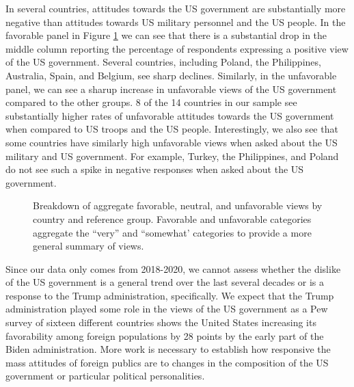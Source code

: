 In several countries, attitudes towards the US government are substantially more negative than attitudes towards US military personnel and the US people. In the favorable panel in Figure \ref{fig:contactbreakdown} we can see that there is a substantial drop in the middle column reporting the percentage of respondents expressing a positive view of the US government. Several countries, including Poland, the Philippines, Australia, Spain, and Belgium, see sharp declines. Similarly, in the unfavorable panel, we can see a sharup increase in unfavorable views of the US government compared to the other groups. 8 of the 14 countries in our sample see substantially higher rates of unfavorable attitudes towards the US government when compared to US troops and the US people. Interestingly, we also see that some countries have similarly high unfavorable views when asked about the US military and US government. For example, Turkey, the Philippines, and Poland do not see such a spike in negative responses when asked about the US government. 

\begin{figure}[t]
	\centering{}
	\caption{Breakdown of aggregate favorable, neutral, and unfavorable views by country and reference group. Favorable and unfavorable categories aggregate the ``very'' and ``somewhat' categories to provide a more general summary of views.}
	\label{fig:contactbreakdown}
\end{figure}

Since our data only comes from 2018-2020, we cannot assess whether the dislike of the US government is a general trend over the last several decades or is a response to the Trump administration, specifically. We expect that the Trump administration played some role in the views of the US government as a Pew survey of sixteen different countries shows the United States increasing its favorability among foreign populations by 28 points by the early part of the Biden administration. \cite{Wike2021} More work is necessary to establish how responsive the mass attitudes of foreign publics are to changes in the composition of the US government or particular political personalities. 

